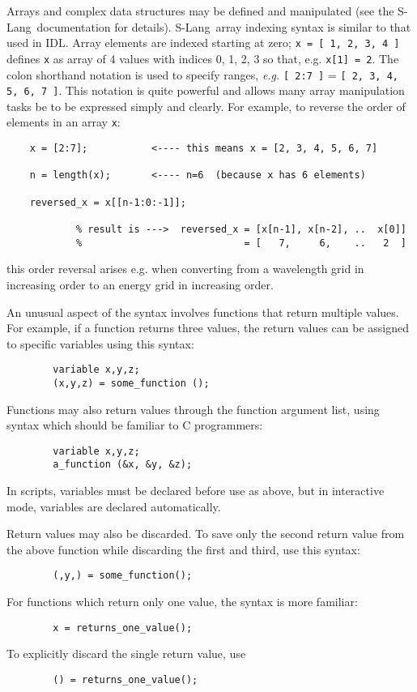 \documentclass{book}
\newcommand{\slang}{{\sc S-Lang}}
\begin{document}
Arrays and complex data structures may be defined and manipulated
(see the \slang\ documentation for details).
\slang\ array indexing syntax is similar to that used in {\sc IDL}.
Array elements are indexed starting at zero;
{\tt x = [ 1, 2, 3, 4 ]} defines {\tt x} as array of 4 values with indices
0, 1, 2, 3 so that, e.g. {\tt x[1] = 2}. The colon shorthand notation is
used to specify ranges, {\it e.g.} {\tt [ 2:7 ]} = {\tt [ 2, 3, 4, 5, 6, 7
]}.  This notation is quite powerful and allows many array manipulation
tasks be to be expressed simply and clearly.  For example, to reverse the
order of elements in an array {\tt x}:
\begin{verbatim}
    x = [2:7];           <---- this means x = [2, 3, 4, 5, 6, 7]

    n = length(x);       <---- n=6  (because x has 6 elements)

    reversed_x = x[[n-1:0:-1]];

            % result is --->  reversed_x = [x[n-1], x[n-2], ..  x[0]]
            %                            = [   7,     6,    ..   2  ]
\end{verbatim}
this order reversal arises e.g. when converting from a wavelength grid
in increasing order to an energy grid in increasing order.

An unusual aspect of the syntax involves functions that return multiple
values.  For example, if a function returns three values, the return values
can be assigned to specific variables using this syntax:
\begin{verbatim}
        variable x,y,z;
        (x,y,z) = some_function ();
\end{verbatim}
Functions may also return values through the function argument
list, using syntax which should be familiar to C programmers:
\begin{verbatim}
        variable x,y,z;
        a_function (&x, &y, &z);
\end{verbatim}
In scripts, variables must be declared before use as above, but in interactive
mode, variables are declared automatically.

Return values may also be discarded. To save only the second
return value from the above function while discarding the first
and third, use this syntax:
\begin{verbatim}
        (,y,) = some_function();
\end{verbatim}
For functions which return only one value, the syntax is more familiar:
\begin{verbatim}
        x = returns_one_value();
\end{verbatim}
To explicitly discard the single return value, use
\begin{verbatim}
        () = returns_one_value();
\end{verbatim}
\end{document}
